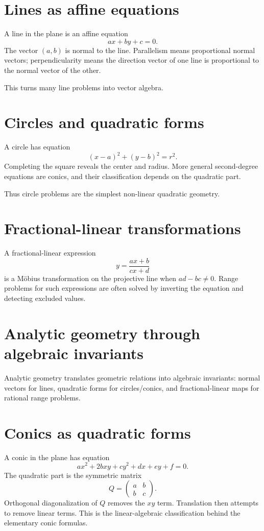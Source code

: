 \section{Lines as affine equations}

A line in the plane is an affine equation
\[
  ax+by+c=0.
\]
The vector \((a,b)\) is normal to the line.  Parallelism means proportional normal vectors; perpendicularity means the direction vector of one line is proportional to the normal vector of the other.

This turns many line problems into vector algebra.

\section{Circles and quadratic forms}

A circle has equation
\[
  (x-a)^2+(y-b)^2=r^2.
\]
Completing the square reveals the center and radius.  More general second-degree equations are conics, and their classification depends on the quadratic part.

Thus circle problems are the simplest non-linear quadratic geometry.

\section{Fractional-linear transformations}

A fractional-linear expression
\[
  y=\frac{ax+b}{cx+d}
\]
is a Möbius transformation on the projective line when \(ad-bc\ne0\).  Range problems for such expressions are often solved by inverting the equation and detecting excluded values.

\section{Analytic geometry through algebraic invariants}

Analytic geometry translates geometric relations into algebraic invariants: normal vectors for lines, quadratic forms for circles/conics, and fractional-linear maps for rational range problems.

\section{Conics as quadratic forms}

A conic in the plane has equation
\[
  ax^2+2bxy+cy^2+dx+ey+f=0.
\]
The quadratic part is the symmetric matrix
\[
  Q=\begin{pmatrix}a&b\\b&c\end{pmatrix}.
\]
Orthogonal diagonalization of $Q$ removes the $xy$ term.  Translation then attempts to remove linear terms.  This is the linear-algebraic classification behind the elementary conic formulas.


